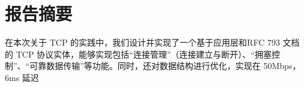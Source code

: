 \chapter{报告摘要}

在本次关于 TCP 的实践中，我们设计并实现了一个基于应用层和RFC 793 文档的 TCP 协议实体，能够实现包括“连接管理”（连接建立与断开）、“拥塞控制”、“可靠数据传输”等功能。同时，还对数据结构进行优化，实现在 50Mbps，6ms 延迟

  
